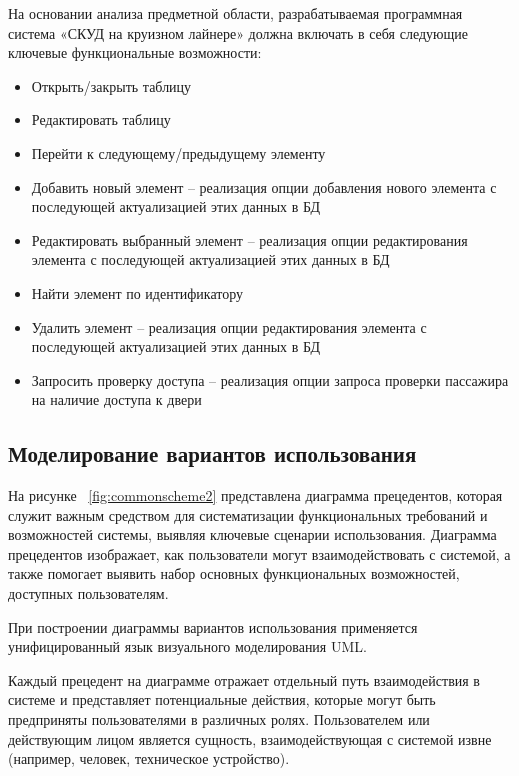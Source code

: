 На основании анализа предметной области, разрабатываемая программная система «СКУД на круизном лайнере» должна включать в себя следующие ключевые функциональные возможности:
\begin{itemize}
	\item Открыть/закрыть таблицу
	\item Редактировать таблицу
	\item Перейти к следующему/предыдущему элементу
	\item Добавить новый элемент -- реализация опции добавления нового элемента с последующей актуализацией этих данных в БД 
	\item Редактировать выбранный элемент -- реализация опции редактирования элемента с последующей актуализацией этих данных в БД 
	\item Найти элемент по идентификатору
	\item Удалить элемент -- реализация опции редактирования элемента с последующей актуализацией этих данных в БД
	\item Запросить проверку доступа -- реализация опции запроса проверки пассажира на наличие доступа к двери
\end{itemize}

\subsection{Моделирование вариантов использования}

На рисунке  ~\ref{fig:commonscheme2} представлена диаграмма прецедентов, которая служит важным средством для систематизации функциональных требований и возможностей системы, выявляя ключевые сценарии использования. Диаграмма прецедентов изображает, как пользователи могут взаимодействовать с системой, а также помогает выявить набор основных функциональных возможностей, доступных пользователям.

При построении диаграммы вариантов использования применяется унифицированный язык визуального моделирования UML.

Каждый прецедент на диаграмме отражает отдельный путь взаимодействия в системе и представляет потенциальные действия, которые могут быть предприняты пользователями в различных ролях. Пользователем или действующим лицом является сущность, взаимодействующая с системой извне (например, человек, техническое устройство).

